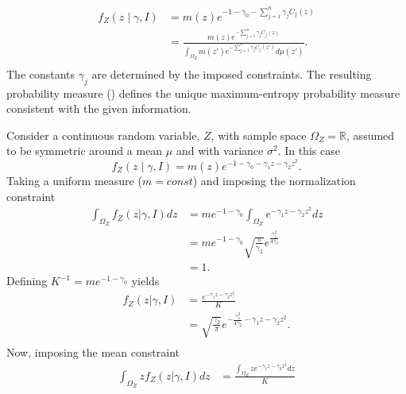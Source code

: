 \begin{equation}
	\begin{split}
		f_Z(z \mid \gamma, I)
		&= m(z) e^{-1 - \gamma_0 - \sum_{j=1}^n \gamma_j C_j(z)} \\
		&= \frac{m(z) e^{-\sum_{j=1}^n \gamma_j C_j(z)}}{
			\int_{\Omega_Z} m(z') e^{-\sum_{j=1}^n \gamma_j C_j(z')} d\mu(z')}.\\
	\end{split}
\end{equation}
The constants $\gamma_j$ are determined by the imposed constraints. The resulting probability measure () defines the unique maximum-entropy probability measure consistent with the given information.

\newpage
\begin{example}
	Consider a continuous random variable, $Z$, with sample space $\Omega_Z=\mathbb{R}$, assumed to be symmetric around a mean $\mu$ and with variance $\sigma^2$. In this case
	\begin{equation}
			f_Z(z \mid \gamma, I)= m(z) e^{-1 - \gamma_0 - \gamma_1z-\gamma_2z^2}.
	\end{equation}
	Taking a uniform measure ($m= const$) and imposing the normalization constraint
	\begin{equation}
		\begin{split}
			\int_{\Omega_Z} f_Z(z|\gamma,I) dz &= me^{-1-\gamma_0}\int_{\Omega_Z} e^{-\gamma_1z-\gamma_2z^2} dz\\
			&= me^{-1-\gamma_0}\sqrt{\frac{\pi}{\gamma_2}}e^{\frac{\gamma_1^2}{4\gamma_2}}\\
			&=1.
		\end{split}
	\end{equation}
	Defining $K^{-1} = me^{-1-\gamma_0}$ yields
	\begin{equation}
		\begin{split}
			f_Z(z|\gamma,I) &= \frac{e^{-\gamma_1z-\gamma_2z^2}}{K}\\
			&= \sqrt{\frac{\gamma_2}{\pi}}e^{-\frac{\gamma_1^2}{4\gamma_2}-\gamma_1z-\gamma_2z^2}.\\
		\end{split}
	\end{equation}
	Now, imposing the mean constraint
	\begin{equation}
		\begin{split}
			\int_{\Omega_Z} zf_Z(z|\gamma,I) dz &= \frac{\int_{\Omega_Z} ze^{-\gamma_1z-\gamma_2z^2}dz}{K}\\

\end{split}
\end{equation}
\end{example}
